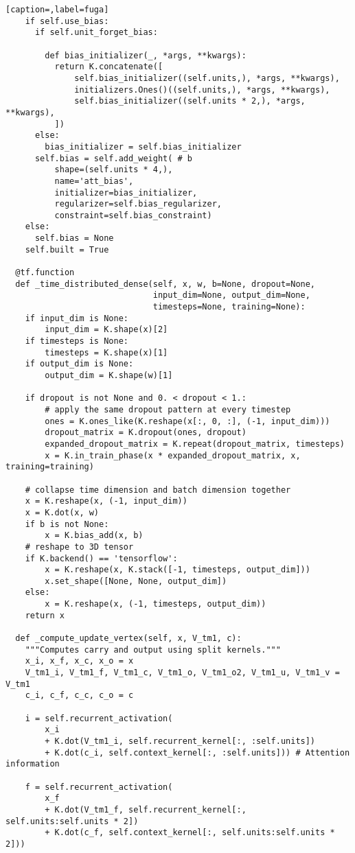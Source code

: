 \begin{lstlisting}[caption=,label=fuga]
    if self.use_bias:
      if self.unit_forget_bias:

        def bias_initializer(_, *args, **kwargs):
          return K.concatenate([
              self.bias_initializer((self.units,), *args, **kwargs),
              initializers.Ones()((self.units,), *args, **kwargs),
              self.bias_initializer((self.units * 2,), *args, **kwargs),
          ])
      else:
        bias_initializer = self.bias_initializer
      self.bias = self.add_weight( # b
          shape=(self.units * 4,),
          name='att_bias',
          initializer=bias_initializer,
          regularizer=self.bias_regularizer,
          constraint=self.bias_constraint)
    else:
      self.bias = None
    self.built = True

  @tf.function
  def _time_distributed_dense(self, x, w, b=None, dropout=None,
                              input_dim=None, output_dim=None,
                              timesteps=None, training=None):
    if input_dim is None:
        input_dim = K.shape(x)[2]
    if timesteps is None:
        timesteps = K.shape(x)[1]
    if output_dim is None:
        output_dim = K.shape(w)[1]

    if dropout is not None and 0. < dropout < 1.:
        # apply the same dropout pattern at every timestep
        ones = K.ones_like(K.reshape(x[:, 0, :], (-1, input_dim)))
        dropout_matrix = K.dropout(ones, dropout)
        expanded_dropout_matrix = K.repeat(dropout_matrix, timesteps)
        x = K.in_train_phase(x * expanded_dropout_matrix, x, training=training)

    # collapse time dimension and batch dimension together
    x = K.reshape(x, (-1, input_dim))
    x = K.dot(x, w)
    if b is not None:
        x = K.bias_add(x, b)
    # reshape to 3D tensor
    if K.backend() == 'tensorflow':
        x = K.reshape(x, K.stack([-1, timesteps, output_dim]))
        x.set_shape([None, None, output_dim])
    else:
        x = K.reshape(x, (-1, timesteps, output_dim))
    return x

  def _compute_update_vertex(self, x, V_tm1, c):
    """Computes carry and output using split kernels."""
    x_i, x_f, x_c, x_o = x
    V_tm1_i, V_tm1_f, V_tm1_c, V_tm1_o, V_tm1_o2, V_tm1_u, V_tm1_v = V_tm1
    c_i, c_f, c_c, c_o = c

    i = self.recurrent_activation(
        x_i
        + K.dot(V_tm1_i, self.recurrent_kernel[:, :self.units])
        + K.dot(c_i, self.context_kernel[:, :self.units])) # Attention information

    f = self.recurrent_activation(
        x_f
        + K.dot(V_tm1_f, self.recurrent_kernel[:, self.units:self.units * 2])
        + K.dot(c_f, self.context_kernel[:, self.units:self.units * 2]))


\end{lstlisting}
